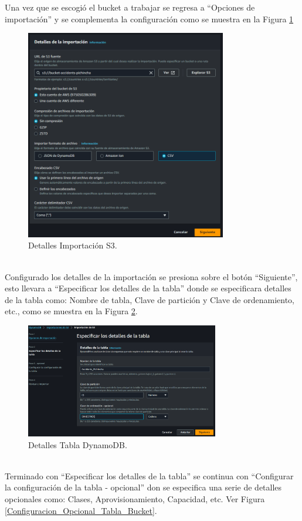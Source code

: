 \documentclass[a4paper,10pt, oneside, titlepage]{article}
\begin{document}
	\indent Una vez que se escogió el bucket a trabajar se regresa a ``Opciones de importación'' y se complementa la configuración como se muestra en la Figura \ref{Detalles_Importaciones_S3}
	\begin{figure}[!h]
		\centering
		\includegraphics[width = 1\linewidth, height = 9.2cm]{Detalles_Importaciones_S3.png}
		\caption{Detalles Importación S3.}
		\label{Detalles_Importaciones_S3}
	\end{figure} \\
	\indent Configurado los detalles de la importación se presiona sobre el botón ``Siguiente'', esto llevara a ``Especificar los detalles de la tabla'' donde se  especificara detalles de la tabla como: Nombre de tabla, Clave de partición y Clave de ordenamiento, etc., como se muestra en la Figura \ref{Detalles_Tabla_Bucket}.
	\begin{figure}[!h]
		\centering
		\includegraphics[width = 1\linewidth, height = 5cm]{Detalles_Tabla_Bucket.png}
		\caption{Detalles Tabla DynamoDB.}
		\label{Detalles_Tabla_Bucket}
	\end{figure} \\
	\indent Terminado con ``Especificar los detalles de la tabla'' se continua con ``Configurar la configuración de la tabla - opcional'' don se especifica una serie de detalles opcionales como: Clases, Aprovisionamiento, Capacidad, etc. Ver Figura \ref{Configuracion_Opcional_Tabla_Bucket}.
\end{document}
